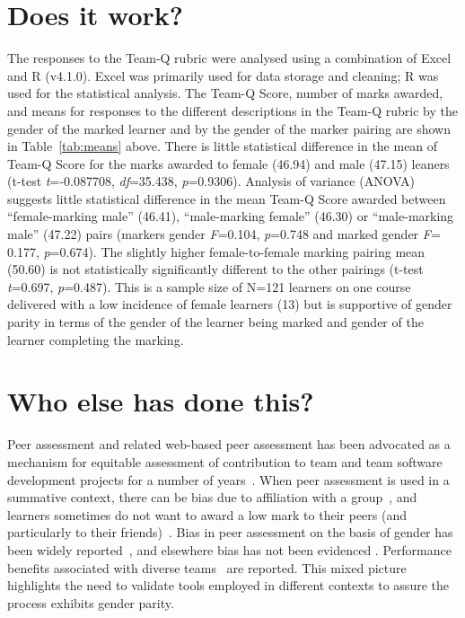 \documentclass[sigconf, anonymous=false]{acmart}
\begin{document}
\section{Does it work?}	
The responses to the Team-Q rubric were analysed using a combination
of Excel and R (v4.1.0). Excel was primarily used for data storage
and cleaning; R was used for the statistical analysis. The Team-Q Score, number of marks awarded, and means for responses to
the different descriptions in the Team-Q rubric by the gender of the
marked learner and by the gender of the marker pairing are shown in
Table~\ref{tab:means} above. There is little statistical difference in the mean of Team-Q Score for the marks awarded to female (46.94) and male (47.15) leaners
(t-test {\emph{t}}=-0.087708, {\emph{df}}=35.438,
{\emph{p}}=0.9306). Analysis of variance (ANOVA) suggests little
statistical difference in the mean Team-Q Score awarded between
``female-marking male'' (46.41), ``male-marking female'' (46.30) or
``male-marking male'' (47.22) pairs (markers gender {\emph{F}}=0.104,
{\emph{p}}=0.748 and marked gender {\emph{F}}= 0.177,
{\emph{p}}=0.674). The slightly higher female-to-female marking
pairing mean (50.60) is not statistically significantly different to
the other pairings (t-test {\emph{t}}=0.697,
{\emph{p}}=0.487).  This is a
sample size of N=121 learners on one course delivered with a low
incidence of female learners (13) but is supportive of gender parity in terms of the gender of the learner being marked and gender of the learner completing the marking.

\section{Who else has done this?}
Peer assessment and related web-based peer assessment has been
advocated as a mechanism for equitable assessment of contribution to
team and team software development projects for a number of
years~\cite{Lejk2001,Clark2005,Raban_Litchfield_2007, Gordon2010,Fagerholm,
Britton2017,Philips21}. When peer assessment is
used in a summative context, there can be bias due to affiliation with
a group~\cite{Cestone2008}, and learners sometimes do not want to
award a low mark to their peers (and particularly to
their friends)~\cite{Sridharam2003}. Bias in peer assessment on the
basis of gender has been widely
reported~\cite{Heels2019,Stonewall2018}, and elsewhere bias has not
been evidenced \cite{Tucker2014,Falchikov1997}. Performance benefits associated with diverse teams~\cite{HBR206} are reported. This mixed picture
highlights the need to validate tools employed in different contexts
to assure the process exhibits gender parity.
\end{document}
